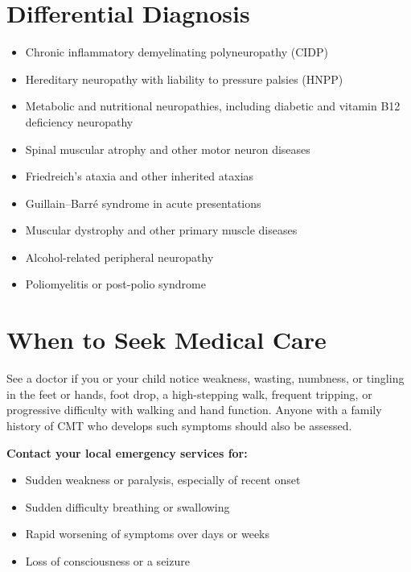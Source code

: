 \section*{Differential Diagnosis}
\begin{itemize}
    \item Chronic inflammatory demyelinating polyneuropathy (CIDP)
    \item Hereditary neuropathy with liability to pressure palsies (HNPP)
    \item Metabolic and nutritional neuropathies, including diabetic and vitamin B12 deficiency neuropathy
    \item Spinal muscular atrophy and other motor neuron diseases
    \item Friedreich's ataxia and other inherited ataxias
    \item Guillain--Barr\'e syndrome in acute presentations
    \item Muscular dystrophy and other primary muscle diseases
    \item Alcohol-related peripheral neuropathy
    \item Poliomyelitis or post-polio syndrome
\end{itemize}

\section*{When to Seek Medical Care}
See a doctor if you or your child notice weakness, wasting, numbness, or tingling in the feet or hands, foot drop, a high-stepping walk, frequent tripping, or progressive difficulty with walking and hand function. Anyone with a family history of CMT who develops such symptoms should also be assessed.

\medskip
\textbf{Contact your local emergency services for:}
\begin{itemize}
    \item Sudden weakness or paralysis, especially of recent onset
    \item Sudden difficulty breathing or swallowing
    \item Rapid worsening of symptoms over days or weeks
    \item Loss of consciousness or a seizure
\end{itemize}

